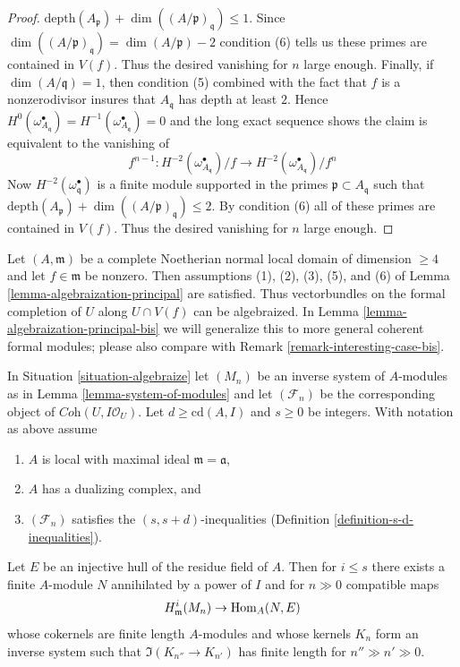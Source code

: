 \begin{proof}
$\text{depth}(A_\mathfrak p) + \dim((A/\mathfrak p)_\mathfrak q) \leq 1$.
Since $\dim((A/\mathfrak p)_\mathfrak q) = \dim(A/\mathfrak p) - 2$
condition (6) tells us these primes are contained in $V(f)$.
Thus the desired vanishing for $n$ large enough.
Finally, if $\dim(A/\mathfrak q) = 1$, then condition (5) combined
with the fact that $f$ is a nonzerodivisor
insures that $A_\mathfrak q$ has depth at least $2$. Hence
$H^0(\omega_{A_\mathfrak q}^\bullet) =
H^{-1}(\omega_{A_\mathfrak q}^\bullet) = 0$
and the long exact sequence shows the claim is
equivalent to the vanishing of
$$
f^{n - 1} :
H^{-2}(\omega_{A_\mathfrak q}^\bullet)/f \to
H^{-2}(\omega_{A_\mathfrak q}^\bullet)/f^n
$$
Now $H^{-2}(\omega^\bullet_\mathfrak q)$ is a finite
module supported in the primes $\mathfrak p \subset A_\mathfrak q$
such that $\text{depth}(A_\mathfrak p) + \dim((A/\mathfrak p)_\mathfrak q)
\leq 2$. By condition (6) all of these primes are contained in $V(f)$.
Thus the desired vanishing for $n$ large enough.
\end{proof}

\begin{remark}
\label{remark-interesting-case}
Let $(A, \mathfrak m)$ be a complete Noetherian normal local domain
of dimension $\geq 4$ and let $f \in \mathfrak m$ be nonzero.
Then assumptions (1), (2), (3), (5), and (6) of
Lemma \ref{lemma-algebraization-principal}
are satisfied. Thus vectorbundles
on the formal completion of $U$ along $U \cap V(f)$
can be algebraized. In Lemma \ref{lemma-algebraization-principal-bis}
we will generalize this to more general coherent formal modules;
please also compare with Remark \ref{remark-interesting-case-bis}.
\end{remark}

\begin{lemma}
\label{lemma-helper-algebraize}
In Situation \ref{situation-algebraize} let $(M_n)$ be an inverse system of
$A$-modules as in Lemma \ref{lemma-system-of-modules} and let
$(\mathcal{F}_n)$ be the corresponding object of
$\textit{Coh}(U, I\mathcal{O}_U)$. Let $d \geq \text{cd}(A, I)$
and $s \geq 0$ be integers.
With notation as above assume
\begin{enumerate}
\item $A$ is local with maximal ideal $\mathfrak m = \mathfrak a$,
\item $A$ has a dualizing complex, and
\item $(\mathcal{F}_n)$ satisfies the $(s, s + d)$-inequalities
(Definition \ref{definition-s-d-inequalities}).
\end{enumerate}
Let $E$ be an injective hull of the residue field of $A$. Then for $i \leq s$
there exists a finite $A$-module $N$ annihilated by a power
of $I$ and for $n \gg 0$ compatible maps
$$
H^i_\mathfrak m(M_n) \to \mathop{\mathrm{Hom}}\nolimits_A(N, E)
$$
whose cokernels are finite length $A$-modules and whose kernels $K_n$
form an inverse system such that $\Im(K_{n''} \to K_{n'})$ has finite
length for $n'' \gg n' \gg 0$.
\end{lemma}


